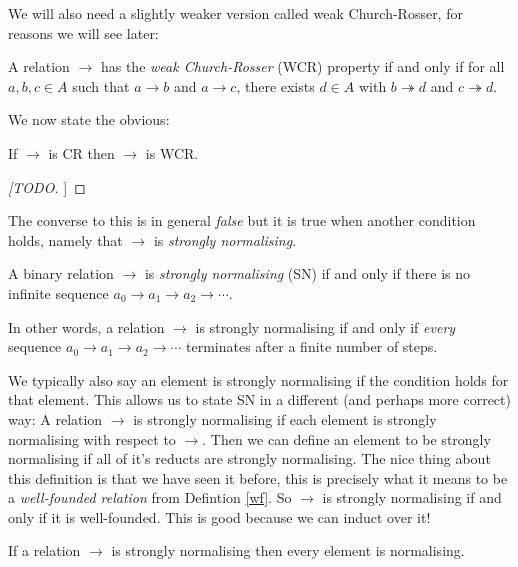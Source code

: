 We will also need a slightly weaker version called weak Church-Rosser, for reasons we will see later:

\begin{defin}
    A relation $\to$ has the \emph{weak Church-Rosser} (WCR) property if and only if for all $a, b, c \in A$ such that $a \to b$ and $a \to c$, there exists $d \in A$ with $b \twoheadrightarrow d$ and $c \twoheadrightarrow d$.
\end{defin}

We now state the obvious:

\begin{cor}\label{cr_is_wcr}
    If $\to$ is CR then $\to$ is WCR.
\end{cor}

\begin{proof}
    [[TODO]]
\end{proof}

The converse to this is in general \emph{false} but it is true when another condition holds, namely that $\to$ is \emph{strongly normalising}.

\begin{defin}
    A binary relation $\to$ is \emph{strongly normalising} (SN) if and only if there is no infinite sequence $a_0 \to a_1 \to a_2 \to  \cdots$.
\end{defin}

\begin{remark}
    In other words, a relation $\to$ is strongly normalising if and only if \emph{every} sequence $a_0 \to a_1 \to a_2 \to  \cdots$ terminates after a finite number of steps.
\end{remark}

\begin{remark}
    We typically also say an element is strongly normalising if the condition holds for that element. This allows us to state SN in a different (and perhaps more correct) way: A relation $\to$ is strongly normalising if each element is strongly normalising with respect to $\to$. Then we can define an element to be strongly normalising if all of it's reducts are strongly normalising. The nice thing about this definition is that we have seen it before, this is precisely what it means to be a \emph{well-founded relation} from Defintion \ref{wf}. So $\to$ is strongly normalising if and only if it is well-founded. This is good because we can induct over it!
\end{remark}

\begin{cor}
    If a relation $\to$ is strongly normalising then every element is normalising.
\end{cor}

